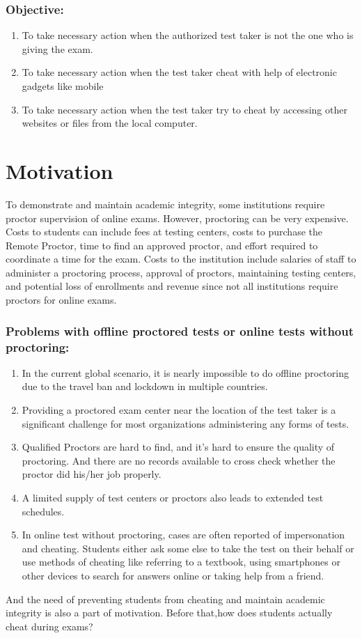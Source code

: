 \documentclass[12pt]{report}
\begin{document}
\subsubsection{Objective:}
\begin{enumerate}
  \item To take necessary action when the authorized test taker is not the one who is giving the exam.
   \item To take necessary action when the test taker cheat with help of electronic gadgets like mobile
   \item To take necessary action when the test taker try to cheat by accessing other websites or files from the local computer.
\end{enumerate}

\section{Motivation}
To demonstrate and maintain academic integrity, some institutions require proctor supervision of online exams. However, proctoring can be very expensive. Costs to students can include fees at testing centers, costs to purchase the Remote Proctor, time to find an approved proctor, and effort required to coordinate a time for the exam. Costs to the institution include salaries of staff to administer a proctoring process, approval of proctors, maintaining testing centers, and potential loss of enrollments and revenue since not all institutions require proctors for online exams.
\subsubsection{ Problems with offline proctored tests or online tests without proctoring:}
\begin{enumerate}
  \item In the current global scenario, it is nearly impossible to do offline proctoring due to the travel ban and lockdown in multiple countries.
   \item  Providing a proctored exam center near the location of the test taker is a significant challenge for most organizations administering any forms of tests.
   \item  Qualified Proctors are hard to find, and it's hard to ensure the quality of proctoring. And there are no records available to cross check whether the proctor did his/her job properly.
 \item A limited supply of test centers or proctors also leads to extended test schedules.
\item In online test without proctoring, cases are often reported of impersonation and cheating. Students either ask some else to take the test on their behalf or use methods of cheating like referring to a textbook, using smartphones or other devices to search for answers online or taking help from a friend.
\end{enumerate}
And the need of preventing students from cheating and maintain academic integrity is also a part of motivation. Before that,how does students actually cheat during exams?\\
\end{document}
